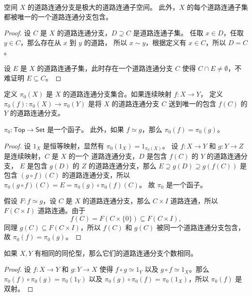 \documentclass[fontset=none]{Notes}
\newcommand{\cat}[1]{\mathsf{#1}}
\begin{document}
\begin{problem}{}{}
  空间 $X$ 的道路连通分支是极大的道路连通子空间。
  此外，$X$ 的每个道路连通子集都被唯一的一个道路连通分支包含。
\end{problem}
\begin{proof}
  设 $C$ 是 $X$ 的道路连通分支，$D\supseteq C$ 是道路连通子集。
  任取 $x\in D$，任取 $y\in C$，那么存在从 $x$ 到 $y$ 的道路，
  所以 $x\sim y$，根据定义有 $x\in C$，所以 $D=C$。
  
  设 $E$ 是 $X$ 的道路连通子集，此时存在一个道路连通分支 $C$
  使得 $C\cap E\neq\emptyset$，不难证明 $E\subseteq C$。
\end{proof}

\begin{definition}
  定义 $\pi_0(X)$ 是 $X$ 的道路连通分支集合。如果连续映射 $f:X\to Y$，
  定义 $\pi_0(f):\pi_0(X)\to\pi_0(Y)$ 是将 $X$ 的道路连通分支 $C$
  送到唯一的包含 $f(C)$ 的 $Y$ 的道路连通分支。
\end{definition}

\begin{theorem}
  $\pi_0:\cat{Top}\to \cat{Set}$ 是一个函子。
  此外，如果 $f\simeq g$，那么 $\pi_0(f)=\pi_0(g)$。 
\end{theorem}
\begin{proof}
  设 $1_X$ 是恒等映射，显然有 $\pi_0(1_X)=1_{\pi_0(X)}$。
  设 $f:X\to Y$ 和 $g:Y\to Z$ 是连续映射，$C$ 是 $X$ 的一个
  道路连通分支，$D$ 是包含 $f(C)$ 的 $Y$ 的道路连通分支，
  $E$ 是包含 $g(D)$ 的 $Z$ 的道路连通分支，那么
  $E\supseteq g(D)\supseteq g(f(C))$ 是包含 $(g\circ f)(C)$
  的道路连通分支，所以 $\pi_0(g\circ f)(C)=E=\pi_0(g)\circ \pi_0(f)(C)$。
  故 $\pi_0$ 是一个函子。

  假设 $F:f\simeq g$，设 $C$ 是 $X$ 的道路连通分支，那么 $C\times I$
  道路连通，所以 $F(C\times I)$ 道路连通。由于
  \[
    f(C)=F(C\times\{0\})\subseteq F(C\times I),
  \]
  同理 $g(C)\subseteq F(C\times I)$，所以 $f(C)$ 和 $g(C)$
  被同一个道路连通分支包含，故 $\pi_0(f)=\pi_0(g)$。
\end{proof}

\begin{corollary}
  如果 $X,Y$ 有相同的同伦型，那么它们的道路连通分支个数相同。
\end{corollary}
\begin{proof}
  设 $f:X\to Y$ 和 $g:Y\to X$ 使得 $f\circ g\simeq 1_Y$ 以及
  $g\circ f\simeq 1_X$。那么 $\pi_0(f)\circ\pi_0(g)=\pi_0(1_Y)$
  以及 $\pi_0(g)\circ\pi_0(f)=\pi_0(1_X)$，所以 $\pi_0(f)$
  是双射。
\end{proof}
\end{document}

